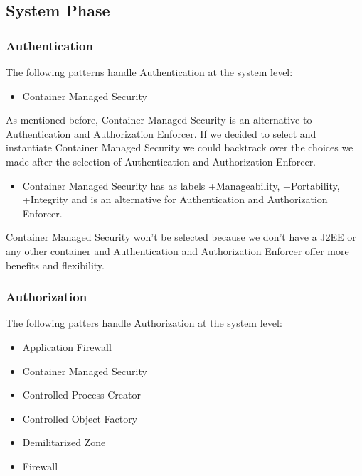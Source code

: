 \documentclass[a4paper,11pt]{report}
\begin{document}
\subsection{System Phase}

\subsubsection{Authentication}
The following patterns handle Authentication at the system level:
\begin{itemize}
\item Container Managed Security
\end{itemize}

As mentioned before, Container Managed Security is an alternative to Authentication and Authorization Enforcer.
If we decided to select and instantiate Container Managed Security we could backtrack over the choices we made
after the selection of Authentication and Authorization Enforcer.

\begin{itemize}
\item Container Managed Security has as labels +Manageability, +Portability, +Integrity and is an alternative for
Authentication and Authorization Enforcer.
\end{itemize}

Container Managed Security won't be selected because we don't have a J2EE or any other container and Authentication
and Authorization Enforcer offer more benefits and flexibility.

\subsubsection{Authorization}
The following patters handle Authorization at the system level:
\begin{itemize}
\item Application Firewall
\item Container Managed Security
\item Controlled Process Creator
\item Controlled Object Factory
\item Demilitarized Zone
\item Firewall
\end{itemize}
\end{document}
